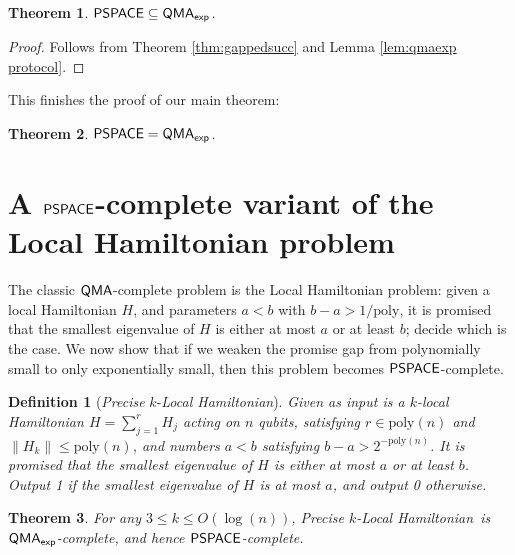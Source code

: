 \documentclass[11pt]{article}
\newtheorem{theorem}{Theorem}
\newtheorem{definition}{Definition}
\theoremstyle{definition}
\theoremstyle{remark}
\newcommand\QMA{{\sf{QMA}}}
\newcommand\PSPACE{{\sf{PSPACE}}}
\newcommand\QMAexp{{\sf{QMA}_{exp}}}
\newcommand\preciseklh{\textit{Precise }$k$-\textit{Local Hamiltonian}}
\newcommand{\poly}{\textrm{poly}}
\begin{document}
\begin{theorem}
$\PSPACE\subseteq\QMAexp$.
\end{theorem}
\begin{proof}
Follows from Theorem \ref{thm:gappedsucc} and Lemma \ref{lem:qmaexp protocol}.
\end{proof}
This finishes the proof of our main theorem:
\begin{theorem}
$\PSPACE=\QMAexp$.
\end{theorem}
\section{A $\PSPACE$-complete variant of the Local Hamiltonian problem}
The classic $\QMA$-complete problem is the Local Hamiltonian problem: given a local Hamiltonian $H$, and parameters $a < b$ with $b-a > 1/\poly$, it is promised that the smallest eigenvalue of $H$ is either at most $a$ or at least $b$; decide which is the case. We now show that if we weaken the promise gap from polynomially small to only exponentially small, then this problem becomes $\PSPACE$-complete.
\begin{definition}[\preciseklh]
Given as input is a $k$-local Hamiltonian $H=\sum_{j=1}^rH_j$ acting on $n$ qubits, satisfying $r \in \poly(n)$ and $\|H_k\| \le \poly(n)$, and numbers $a < b$ satisfying $b - a > 2^{-\poly(n)}$. It is promised that the smallest eigenvalue of $H$ is either at most $a$ or at least $b$. Output 1 if the smallest eigenvalue of $H$ is at most $a$, and output 0 otherwise.
\end{definition}
\begin{theorem}
For any $3 \le k \le O(\log(n))$, \preciseklh \ is $\QMAexp$-complete, and hence $\PSPACE$-complete.
\end{theorem}
\end{document}
